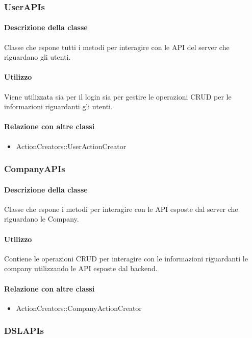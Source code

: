 \subsubsection{UserAPIs}
\paragraph*{Descrizione della classe}
Classe che espone tutti i metodi per interagire con le API del server che riguardano gli utenti.

\paragraph*{Utilizzo}
Viene utilizzata sia per il login sia per gestire le operazioni CRUD per le informazioni riguardanti gli utenti.

\paragraph*{Relazione con altre classi}
\begin{itemize}
\item ActionCreators::UserActionCreator
\end{itemize}

\subsubsection{CompanyAPIs}
\paragraph*{Descrizione della classe}
Classe che espone i metodi per interagire con le API esposte dal server che riguardano le Company.

\paragraph*{Utilizzo}
Contiene le operazioni CRUD per interagire con le informazioni riguardanti le company utilizzando le API esposte dal backend.

\paragraph*{Relazione con altre classi}
\begin{itemize}
\item ActionCreators::CompanyActionCreator
\end{itemize}

\subsubsection{DSLAPIs}
